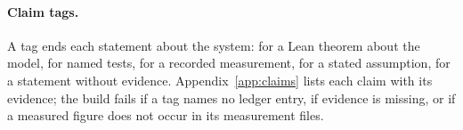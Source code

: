 \paragraph{Claim tags.} A tag ends each statement about the system:
 for a Lean theorem about the model,  for
named tests,  for a recorded measurement,
 for a stated assumption,  for a
statement without evidence. Appendix~\ref{app:claims} lists each claim with
its evidence; the build fails if a tag names no ledger entry, if evidence is
missing, or if a measured figure does not occur in its measurement files.
